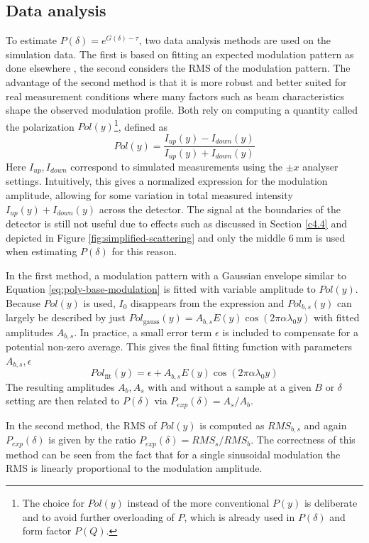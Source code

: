 \subsection{Data analysis}
To estimate $P(\delta) = e^{G(\delta)  - \tau}$, two data analysis methods are used on the simulation data. The first is based on fitting an expected modulation pattern as done elsewhere \cite{bouwman2011}\cite{parnell2023}, the second considers the RMS of the modulation pattern. The advantage of the second method is that it is more robust and better suited for real measurement conditions where many factors such as beam characteristics shape the observed modulation profile. Both rely on computing a quantity called the polarization $Pol(y)$\footnote{The choice for $Pol(y)$ instead of the more conventional $P(y)$ is deliberate and to avoid further overloading of $P$, which is already used in $P(\delta)$ and form factor $P(Q)$.}, defined as 
$$Pol(y) = \frac{I_{up}(y) - I_{down}(y)}{I_{up}(y) + I_{down}(y)}$$
Here $I_{up}, I_{down}$ correspond to simulated measurements using the $\pm x$ analyser settings. Intuitively, this gives a normalized expression for the modulation amplitude, allowing for some variation in total measured intensity $I_{up}(y) + I_{down}(y)$ across the detector. The signal at the boundaries of the detector is still not useful due to effects such as discussed in Section \ref{c4.4} and depicted in Figure \ref{fig:simplified-scattering} and only the middle $\SI{6}{\milli\meter}$ is used when estimating $P(\delta)$ for this reason.

In the first method, a modulation pattern with a Gaussian envelope similar to Equation \eqref{eq:poly-base-modulation} is fitted with variable amplitude to $Pol(y)$. Because $Pol(y)$ is used, $I_0$ disappears from the expression and $Pol_{b,s}(y)$ can largely be described by just $Pol_{\text{gauss}}(y) = A_{b,s}E(y)\cos(2\pi\alpha\lambda_0y)$ with fitted amplitudes $A_{b,s}$. In practice, a small error term $\epsilon$ is included to compensate for a potential non-zero average. This gives the final fitting function with parameters $A_{b,s}, \epsilon$
\begin{equation}
	Pol_{\text{fit}}(y) = \epsilon+ A_{b,s}E(y)\cos(2\pi\alpha\lambda_0y) \label{eq:gauss-fit-function}
\end{equation}
The resulting amplitudes $A_b, A_s$ with and without a sample at a given $B$ or $\delta$ setting are then related to $P(\delta)$ via $P_{exp}(\delta) = A_s/A_b$. 

In the second method, the RMS of $Pol(y)$ is computed as $RMS_{b,s}$ and again $P_{exp}(\delta)$ is given by the ratio $P_{exp}(\delta) = RMS_s/RMS_b$. The correctness of this method can be seen from the fact that for a single sinusoidal modulation the RMS is linearly proportional to the modulation amplitude. 

